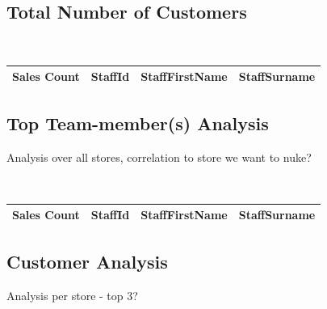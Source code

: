 \documentclass{article}
\begin{document}
            \subsection{Total Number of Customers}

            \begin{lstlisting}
                
            \end{lstlisting}

            \begin{table}[H]
                \centering
                \begin{tabular}{|l|l|l|l|}
                \hline
                Sales Count & StaffId & StaffFirstName & StaffSurname \\ \hline
                \end{tabular}
                \end{table}

            \subsection{Top Team-member(s) Analysis}
                Analysis over all stores, correlation to store we want to nuke?

                \begin{lstlisting}
                   
                \end{lstlisting}

                \begin{table}[H]
                    \centering
                    \begin{tabular}{|l|l|l|l|}
                    \hline
                    Sales Count & StaffId & StaffFirstName & StaffSurname \\ \hline
                    \end{tabular}
                    \end{table}

            \subsection{Customer Analysis}
                Analysis per store - top 3?

                \begin{lstlisting}
                   
                \end{lstlisting}
\end{document}
